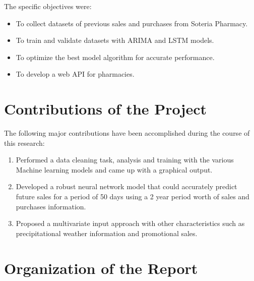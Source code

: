 \documentclass[12pt]{report}
\begin{document}
The specific objectives  were:

\begin{itemize}[topsep=0pt]

\item To collect datasets of previous sales and purchases from Soteria Pharmacy.

\item To train and validate datasets with ARIMA and LSTM models.

\item To optimize the best model algorithm for accurate performance.

\item To develop  a web API for pharmacies.

\end{itemize}













\section{Contributions of the Project}

The following major contributions have been accomplished during the course of this research:

\begin{enumerate}[topsep=0pt]

\item Performed a data cleaning task, analysis and training with the various Machine learning models and came up with a graphical output.

\item Developed a robust neural network model that could accurately predict future sales for a period of 50 days using a 2 year period worth of sales and purchases information.

\item Proposed a multivariate input approach with other characteristics such as precipitational weather information and promotional sales.

\end{enumerate}






\section{Organization of the Report}
\end{document}
